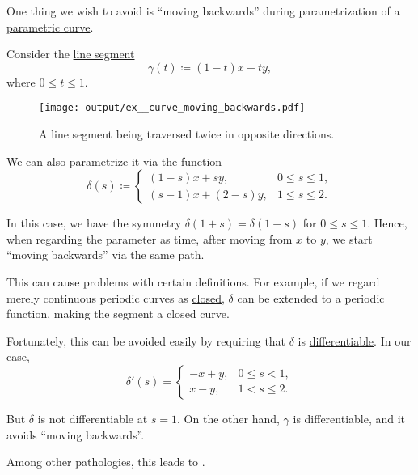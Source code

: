 \begin{example}\label{ex:curve_moving_backwards}
  One thing we wish to avoid is \enquote{moving backwards} during parametrization of a \hyperref[def:parametric_curve]{parametric curve}.

  Consider the \hyperref[def:line_segment]{line segment}
  \begin{equation*}
    \gamma(t) \coloneqq (1 - t) x + ty,
  \end{equation*}
  where \( 0 \leq t \leq 1 \).

  \begin{figure}[!ht]
    \centering
    \texttt{[image: output/ex\_\_curve\_moving\_backwards.pdf]}
    \caption{A line segment being traversed twice in opposite directions.}\label{fig:ex:curve_moving_backwards}
  \end{figure}

  We can also parametrize it via the function
  \begin{equation*}
    \delta(s) \coloneqq \begin{cases}
      (1 - s)x + sy,       &0 \leq s \leq 1, \\
      (s - 1)x + (2 - s)y, &1 \leq s \leq 2.
    \end{cases}
  \end{equation*}

  In this case, we have the symmetry \( \delta(1 + s) = \delta(1 - s) \) for \( 0 \leq s \leq 1 \). Hence, when regarding the parameter as time, after moving from \( x \) to \( y \), we start \enquote{moving backwards} via the same path.

  This can cause problems with certain definitions. For example, if we regard merely continuous periodic curves as \hyperref[def:closed_curve]{closed}, \( \delta \) can be extended to a periodic function, making the segment a closed curve.

  Fortunately, this can be avoided easily by requiring that \( \delta \) is \hyperref[def:differentiability/frechet]{differentiable}. In our case,
  \begin{equation*}
    \delta'(s) = \begin{cases}
      -x + y, &0 \leq s < 1, \\
      x - y,  &1 < s \leq 2.
    \end{cases}
  \end{equation*}

  But \( \delta \) is not differentiable at \( s = 1 \). On the other hand, \( \gamma \) is differentiable, and it avoids \enquote{moving backwards}.

  Among other pathologies, this leads to .
\end{example}

